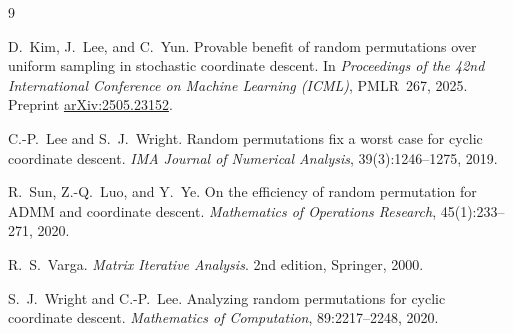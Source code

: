 \documentclass[11pt]{article}
\theoremstyle{plain}
\theoremstyle{definition}
\theoremstyle{remark}
\begin{document}
\begin{thebibliography}{9}

D.~Kim, J.~Lee, and C.~Yun.
Provable benefit of random permutations over uniform sampling in stochastic coordinate descent.
In \emph{Proceedings of the 42nd International Conference on Machine Learning (ICML)}, PMLR~267, 2025.
Preprint \href{https://arxiv.org/abs/2505.23152}{arXiv:2505.23152}.

C.-P.~Lee and S.~J.~Wright.
Random permutations fix a worst case for cyclic coordinate descent.
\emph{IMA Journal of Numerical Analysis}, 39(3):1246--1275, 2019.

R.~Sun, Z.-Q.~Luo, and Y.~Ye.
On the efficiency of random permutation for ADMM and coordinate descent.
\emph{Mathematics of Operations Research}, 45(1):233--271, 2020.

R.~S.~Varga.
\emph{Matrix Iterative Analysis}.
2nd edition, Springer, 2000.

S.~J.~Wright and C.-P.~Lee.
Analyzing random permutations for cyclic coordinate descent.
\emph{Mathematics of Computation}, 89:2217--2248, 2020.

\end{thebibliography}
\end{document}
